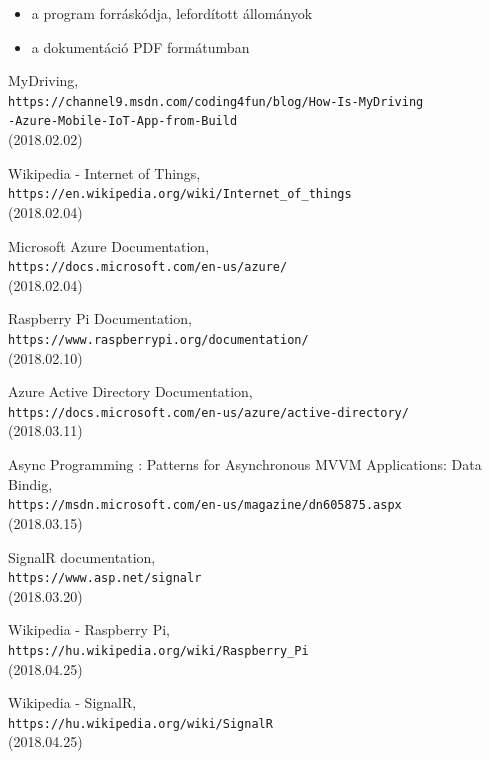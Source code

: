 \documentclass[a4paper,12pt]{report}
\begin{document}
    \begin{itemize}
        \item a program forráskódja, lefordított állományok
        \item a dokumentáció PDF formátumban
    \end{itemize}
    \begin{thebibliography}{9}

        MyDriving,
        \\\texttt{https://channel9.msdn.com/coding4fun/blog/How-Is-MyDriving\\-Azure-Mobile-IoT-App-from-Build}\\
        (2018.02.02)

        Wikipedia - Internet of Things,
        \\\texttt{https://en.wikipedia.org/wiki/Internet\_of\_things}\\
        (2018.02.04)

        Microsoft Azure Documentation,
        \\\texttt{https://docs.microsoft.com/en-us/azure/}\\
        (2018.02.04)

        Raspberry Pi Documentation,
        \\\texttt{https://www.raspberrypi.org/documentation/}\\
        (2018.02.10)

        Azure Active Directory Documentation,
        \\\texttt{https://docs.microsoft.com/en-us/azure/active-directory/}\\
        (2018.03.11)

        Async Programming : Patterns for Asynchronous MVVM Applications: Data Bindig,
        \\\texttt{https://msdn.microsoft.com/en-us/magazine/dn605875.aspx}\\
        (2018.03.15)

        SignalR documentation,
        \\\texttt{https://www.asp.net/signalr}\\
        (2018.03.20)

        Wikipedia - Raspberry Pi,
        \\\texttt{https://hu.wikipedia.org/wiki/Raspberry\_Pi}\\
        (2018.04.25)

        Wikipedia - SignalR,
        \\\texttt{https://hu.wikipedia.org/wiki/SignalR}\\
        (2018.04.25)

    \end{thebibliography}
\end{document}
